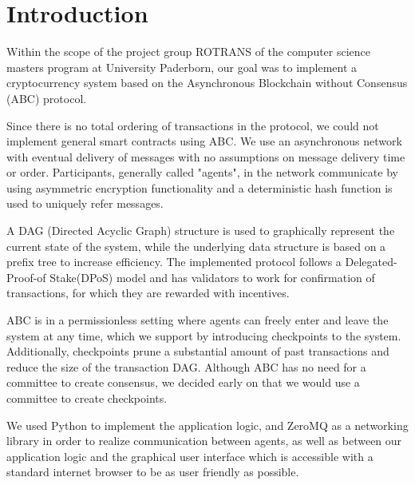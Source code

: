 \section{Introduction}

Within the scope of the project group ROTRANS of the computer science masters program at University Paderborn, our goal was to implement a cryptocurrency system based on the Asynchronous Blockchain without Consensus (ABC) protocol. 

Since there is no total ordering of transactions in the protocol, we could not implement general smart contracts using ABC. We use an asynchronous network with eventual delivery of messages with no assumptions on message delivery time or order. Participants, generally called "agents", in the network communicate by using asymmetric encryption functionality and a deterministic hash function is used to uniquely refer messages.

A DAG (Directed Acyclic Graph) structure is used to graphically represent the current state of the system, while the underlying data structure is based on a prefix tree to increase efficiency. The implemented protocol follows a Delegated-Proof-of Stake(DPoS) model and has validators to work for confirmation of transactions, for which they are rewarded with incentives. 

ABC is in a permissionless setting where agents can freely enter and leave the system at any time, which we support by introducing checkpoints to the system. Additionally, checkpoints prune a substantial amount of past transactions and reduce the size of the transaction DAG. Although ABC has no need for a committee to create consensus, we decided early on that we would use a committee to create checkpoints.

We used Python to implement the application logic, and ZeroMQ as a networking library in order to realize communication between agents, as well as between our application logic and the graphical user interface which is accessible with a standard internet browser to be as user friendly as possible.

































